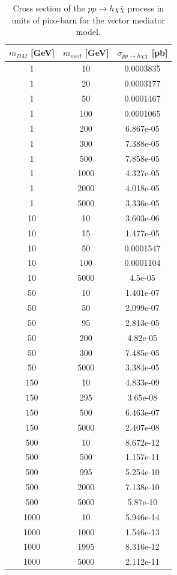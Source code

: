 \begin{table}
	\centering
	\begin{tabular}{ccc}
		$m_{DM}$ [GeV] & $m_{med}$ [GeV] & $\sigma_{pp\rightarrow h\chi\bar{\chi}}$ [pb] \\ \hline
		1 & 10 & 0.0003835 \\
		1 & 20 & 0.0003177 \\
		1 & 50 & 0.0001467 \\
		1 & 100 & 0.0001065 \\
		1 & 200 & 6.867e-05 \\
		1 & 300 & 7.388e-05 \\
		1 & 500 & 7.858e-05 \\
		1 & 1000 & 4.327e-05 \\
		1 & 2000 & 4.018e-05 \\
		1 & 5000 & 3.336e-05 \\ \hline
		10 & 10 & 3.603e-06 \\
		10 & 15 & 1.477e-05 \\
		10 & 50 & 0.0001547 \\
		10 & 100 & 0.0001104 \\
		10 & 5000 & 4.5e-05 \\ \hline
		50 & 10 & 1.401e-07 \\
		50 & 50 & 2.099e-07 \\
		50 & 95 & 2.813e-05 \\
		50 & 200 & 4.82e-05 \\
		50 & 300 & 7.485e-05 \\
		50 & 5000 & 3.384e-05 \\ \hline
		150 & 10 & 4.833e-09 \\
		150 & 295 & 3.65e-08 \\
		150 & 500 & 6.463e-07 \\
		150 & 5000 & 2.407e-08 \\ \hline
		500 & 10 & 8.672e-12 \\
		500 & 500 & 1.157e-11 \\
		500 & 995 & 5.254e-10 \\
		500 & 2000 & 7.138e-10 \\
		500 & 5000 & 5.87e-10 \\ \hline
		1000 & 10 & 5.946e-14 \\
		1000 & 1000 & 1.546e-13 \\
		1000 & 1995 & 8.316e-12 \\
		1000 & 5000 & 2.112e-11 \\ \hline
	\end{tabular}
	\caption{ Cross section of the $pp \rightarrow h\chi\bar{\chi}$ process 
		in units of pico-barn for the vector mediator model. 
		\label{tab:zprimeXS}}
\end{table}

